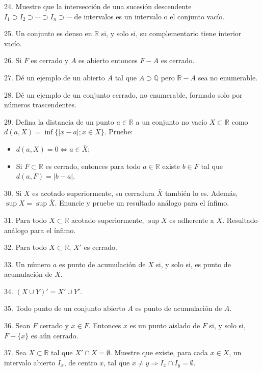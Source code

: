 \documentclass[12pt,oneside]{book}
\begin{document}
24. Muestre que la intersección de una sucesión descendente \( I_1 \supset I_2 \supset \cdots \supset I_n \supset \cdots \) de intervalos es un intervalo o el conjunto vacío.

25. Un conjunto es denso en \( \mathbb{R} \) si, y solo si, su complementario tiene interior vacío.

26. Si \( F \) es cerrado y \( A \) es abierto entonces \( F - A \) es cerrado.

27. Dé un ejemplo de un abierto \( A \) tal que \( A \supset \mathbb{Q} \) pero \( \mathbb{R} - A \) sea no enumerable.

28. Dé un ejemplo de un conjunto cerrado, no enumerable, formado solo por números trascendentes.

29. Defina la distancia de un punto \( a \in \mathbb{R} \) a un conjunto no vacío \( X \subset \mathbb{R} \) como \( d(a, X) = \inf\{|x - a|; x \in X\} \). Pruebe:
\begin{itemize}
    \item[1.] \( d(a, X) = 0 \Leftrightarrow a \in \bar{X} \);\\
    \item[2.] Si \( F \subset \mathbb{R} \) es cerrado, entonces para todo \( a \in \mathbb{R} \) existe \( b \in F \) tal que \( d(a, F) = |b - a| \).
\end{itemize}

30. Si \( X \) es acotado superiormente, su cerradura \( \bar{X} \) también lo es. Además, \( \sup X = \sup \bar{X} \). Enuncie y pruebe un resultado análogo para el ínfimo.

31. Para todo \( X \subset \mathbb{R} \) acotado superiormente, \( \sup X \) es adherente a \( X \). Resultado análogo para el ínfimo.

32. Para todo \( X \subset \mathbb{R} \), \( X' \) es cerrado.

33. Un número \( a \) es punto de acumulación de \( X \) si, y solo si, es punto de acumulación de \( \bar{X} \).

34. \( (X \cup Y)' = X' \cup Y' \).

35. Todo punto de un conjunto abierto \( A \) es punto de acumulación de \( A \).

36. Sean \( F \) cerrado y \( x \in F \). Entonces \( x \) es un punto aislado de \( F \) si, y solo si, \( F - \{x\} \) es aún cerrado.

37. Sea \( X \subset \mathbb{R} \) tal que \( X' \cap X = \emptyset \). Muestre que existe, para cada \( x \in X \), un intervalo abierto \( I_x \), de centro \( x \), tal que \( x \neq y \Rightarrow I_x \cap I_y = \emptyset \).
\end{document}
